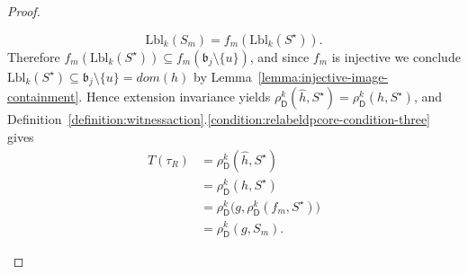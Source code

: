 \documentclass[11pt,a4paper]{article}
\newcommand{\treewidthvalue}{k}
\newcommand{\abag}{\mathfrak{b}}
\newcommand{\abstractdecomposition}{\tau}
\newcommand{\vertexone}{u}
\newcommand{\dpcore}{\mathsf{D}}
\newcommand{\witnessset}{S}
\newcommand{\domain}{dom}
\newcommand{\dprefutation}{R}
\newcommand{\subtermToBag}{T}
\newcommand{\relabelingfunction}{f}
\newcommand{\action}{\rho}
\begin{document}
\begin{proof}
\begin{enumerate}
	\[
	\mathrm{Lbl}_{\treewidthvalue}(\witnessset_m)=\relabelingfunction_m(\mathrm{Lbl}_{\treewidthvalue}(S^\star)).
	\]
	Therefore $\relabelingfunction_m(\mathrm{Lbl}_{\treewidthvalue}(S^\star))\subseteq \relabelingfunction_m(\abag_j\setminus\{\vertexone\})$, and since $\relabelingfunction_m$ is injective we conclude $\mathrm{Lbl}_{\treewidthvalue}(S^\star)\subseteq \abag_j\setminus\{\vertexone\}=\domain(h)$ by Lemma~\ref{lemma:injective-image-containment}.
	Hence extension invariance yields $\action_{\dpcore}^{\treewidthvalue}(\hat h,S^\star)=\action_{\dpcore}^{\treewidthvalue}(h,S^\star)$, and Definition~\ref{definition:witnessaction}.\ref{condition:relabeldpcore-condition-three} gives
		\[
		\begin{aligned}
		\subtermToBag(\abstractdecomposition_{\dprefutation})
		&= \action_{\dpcore}^{\treewidthvalue}(\hat h,S^\star)\\
		&= \action_{\dpcore}^{\treewidthvalue}(h,S^\star)\\
		&= \action_{\dpcore}^{\treewidthvalue}\bigl(g,\action_{\dpcore}^{\treewidthvalue}(\relabelingfunction_m,S^\star)\bigr)\\
		&= \action_{\dpcore}^{\treewidthvalue}(g,\witnessset_m).
		\end{aligned}
		\]


\end{enumerate}
\end{proof}
\end{document}
